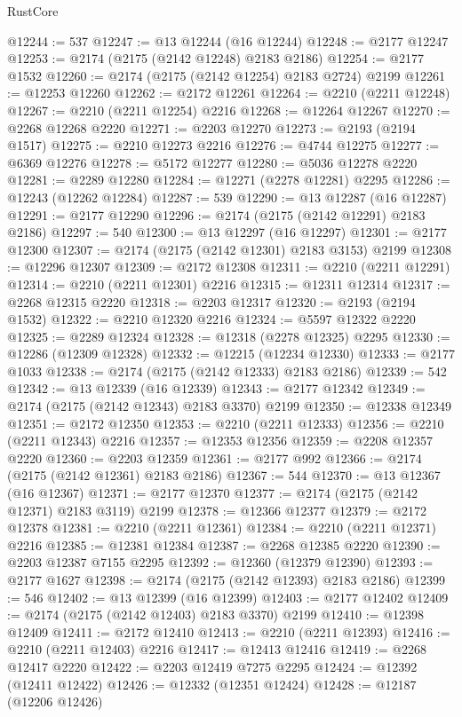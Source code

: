 \begin{lexlean}{RustCore}
\begin{coremodule}
@12244 := 537
@12247 := @13 @12244 (@16 @12244)
@12248 := @2177 @12247
@12253 := @2174 (@2175 (@2142 @12248) @2183 @2186)
@12254 := @2177 @1532
@12260 := @2174 (@2175 (@2142 @12254) @2183 @2724) @2199
@12261 := @12253 @12260
@12262 := @2172 @12261
@12264 := @2210 (@2211 @12248)
@12267 := @2210 (@2211 @12254) @2216
@12268 := @12264 @12267
@12270 := @2268 @12268 @2220
@12271 := @2203 @12270
@12273 := @2193 (@2194 @1517)
@12275 := @2210 @12273 @2216
@12276 := @4744 @12275
@12277 := @6369 @12276
@12278 := @5172 @12277
@12280 := @5036 @12278 @2220
@12281 := @2289 @12280
@12284 := @12271 (@2278 @12281) @2295
@12286 := @12243 (@12262 @12284)
@12287 := 539
@12290 := @13 @12287 (@16 @12287)
@12291 := @2177 @12290
@12296 := @2174 (@2175 (@2142 @12291) @2183 @2186)
@12297 := 540
@12300 := @13 @12297 (@16 @12297)
@12301 := @2177 @12300
@12307 := @2174 (@2175 (@2142 @12301) @2183 @3153) @2199
@12308 := @12296 @12307
@12309 := @2172 @12308
@12311 := @2210 (@2211 @12291)
@12314 := @2210 (@2211 @12301) @2216
@12315 := @12311 @12314
@12317 := @2268 @12315 @2220
@12318 := @2203 @12317
@12320 := @2193 (@2194 @1532)
@12322 := @2210 @12320 @2216
@12324 := @5597 @12322 @2220
@12325 := @2289 @12324
@12328 := @12318 (@2278 @12325) @2295
@12330 := @12286 (@12309 @12328)
@12332 := @12215 (@12234 @12330)
@12333 := @2177 @1033
@12338 := @2174 (@2175 (@2142 @12333) @2183 @2186)
@12339 := 542
@12342 := @13 @12339 (@16 @12339)
@12343 := @2177 @12342
@12349 := @2174 (@2175 (@2142 @12343) @2183 @3370) @2199
@12350 := @12338 @12349
@12351 := @2172 @12350
@12353 := @2210 (@2211 @12333)
@12356 := @2210 (@2211 @12343) @2216
@12357 := @12353 @12356
@12359 := @2208 @12357 @2220
@12360 := @2203 @12359
@12361 := @2177 @992
@12366 := @2174 (@2175 (@2142 @12361) @2183 @2186)
@12367 := 544
@12370 := @13 @12367 (@16 @12367)
@12371 := @2177 @12370
@12377 := @2174 (@2175 (@2142 @12371) @2183 @3119) @2199
@12378 := @12366 @12377
@12379 := @2172 @12378
@12381 := @2210 (@2211 @12361)
@12384 := @2210 (@2211 @12371) @2216
@12385 := @12381 @12384
@12387 := @2268 @12385 @2220
@12390 := @2203 @12387 @7155 @2295
@12392 := @12360 (@12379 @12390)
@12393 := @2177 @1627
@12398 := @2174 (@2175 (@2142 @12393) @2183 @2186)
@12399 := 546
@12402 := @13 @12399 (@16 @12399)
@12403 := @2177 @12402
@12409 := @2174 (@2175 (@2142 @12403) @2183 @3370) @2199
@12410 := @12398 @12409
@12411 := @2172 @12410
@12413 := @2210 (@2211 @12393)
@12416 := @2210 (@2211 @12403) @2216
@12417 := @12413 @12416
@12419 := @2268 @12417 @2220
@12422 := @2203 @12419 @7275 @2295
@12424 := @12392 (@12411 @12422)
@12426 := @12332 (@12351 @12424)
@12428 := @12187 (@12206 @12426)

\end{coremodule}
\end{lexlean}

